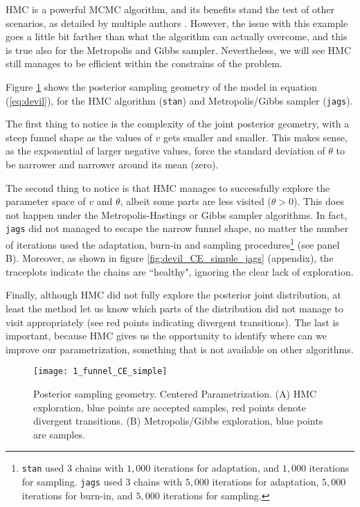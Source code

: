 HMC is a powerful MCMC algorithm, and its benefits stand the test of other scenarios, as detailed by multiple authors \cite{McElreath_2020, Gelman_et_al_2014}. However, the issue with this example goes a little bit farther than what the algorithm can actually overcome, and this is true also for the Metropolis and Gibbs sampler. Nevertheless, we will see HMC still manages to be efficient within the constrains of the problem.

Figure \ref{fig:devil_CE_geom} shows the posterior sampling geometry of the model in equation (\ref{eq:devil}), for the HMC algorithm (\texttt{stan}) and Metropolis/Gibbs sampler (\texttt{jags}). 

The first thing to notice is the complexity of the joint posterior geometry, with a steep funnel shape as the values of $v$ gets smaller and smaller. This makes sense, as the exponential of larger negative values, force the standard deviation of $\theta$ to be narrower and narrower around its mean (zero). 

The second thing to notice is that HMC manages to successfully explore the parameter space of $v$ and $\theta$, albeit some parts are less visited ($\theta>0$). This does not happen under the Metropolis-Hastings or Gibbs sampler algorithms. In fact, \texttt{jags} did not managed to escape the narrow funnel shape, no matter the number of iterations used the adaptation, burn-in and sampling procedures\footnote{\texttt{stan} used $3$ chains with $1,000$ iterations for adaptation, and $1,000$ iterations for sampling. \texttt{jags} used $3$ chains with $5,000$ iterations for adaptation, $5,000$ iterations for burn-in, and $5,000$ iterations for sampling.} (see panel B). Moreover, as shown in figure \ref{fig:devil_CE_simple_jags} (appendix), the traceplots indicate the chains are ``healthy", ignoring the clear lack of exploration.

Finally, although HMC did not fully explore the posterior joint distribution, at least the method let us know which parts of the distribution did not manage to visit appropriately (see red points indicating divergent transitions). The last is important, because HMC gives us the opportunity to identify where can we improve our parametrization, something that is not available on other algorithms.
%
\begin{figure}[h]
	\centering
	\texttt{[image: 1\_funnel\_CE\_simple]}
	\caption[Posterior sampling geometry. Centered Parametrization.]%
	{Posterior sampling geometry. Centered Parametrization. (A) HMC exploration, blue points are accepted samples, red points denote divergent transitions. (B) Metropolis/Gibbs exploration, blue points are samples.}
	\label{fig:devil_CE_geom}
\end{figure}

